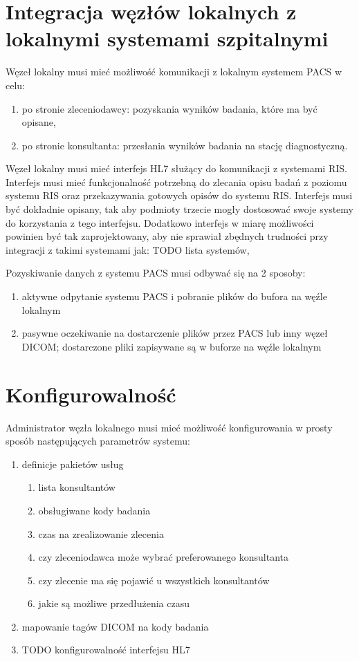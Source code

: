 \documentclass[a4paper]{report}
\begin{document}
\section{Integracja węzłów lokalnych z lokalnymi systemami szpitalnymi}

Węzeł lokalny musi mieć możliwość komunikacji z lokalnym systemem PACS w celu:
\begin{enumerate}
 \item po stronie zleceniodawcy: pozyskania wyników badania, które ma być opisane,
 \item po stronie konsultanta: przesłania wyników badania na stację diagnostyczną.
\end{enumerate}

Węzeł lokalny musi mieć interfejs HL7 służący do komunikacji z systemami RIS. Interfejs musi mieć funkcjonalność potrzebną do zlecania opisu badań z poziomu systemu RIS oraz przekazywania gotowych opisów do systemu RIS. Interfejs musi być dokładnie opisany, tak aby podmioty trzecie mogły dostosować swoje systemy do korzystania z tego interfejsu. Dodatkowo interfejs w miarę możliwości powinien być tak zaprojektowany, aby nie sprawiał zbędnych trudności przy integracji z takimi systemami jak: TODO lista systemów, 

Pozyskiwanie danych z systemu PACS musi odbywać się na 2 sposoby:
\begin{enumerate}
  \item aktywne odpytanie systemu PACS i pobranie plików do bufora na węźle lokalnym
  \item pasywne oczekiwanie na dostarczenie plików przez PACS lub inny węzeł DICOM; dostarczone pliki zapisywane są w buforze na węźle lokalnym
\end{enumerate}

\section{Konfigurowalność}
\label{zlecenia-konfig}

Administrator węzła lokalnego musi mieć możliwość konfigurowania w prosty sposób następujących parametrów systemu:
\begin{enumerate}
\item definicje pakietów usług
  \begin{enumerate}
   \item lista konsultantów
   \item obsługiwane kody badania
   \item czas na zrealizowanie zlecenia
   \item czy zleceniodawca może wybrać preferowanego konsultanta
   \item czy zlecenie ma się pojawić u wszystkich konsultantów
   \item jakie są możliwe przedłużenia czasu
  \end{enumerate}

\item mapowanie tagów DICOM na kody badania

\item TODO konfigurowalność interfejsu HL7

\end{enumerate}
\end{document}
